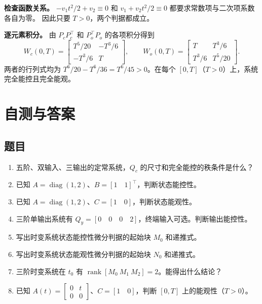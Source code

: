 \documentclass[UTF8,a4paper,12pt,fontset=fandol]{ctexart}
\DeclareMathOperator{\rank}{rank}
\begin{document}
\textbf{检查函数关系。}
$-v_1t^2/2+v_2\equiv0$ 和 $v_1+v_2t^2/2\equiv0$ 都要求常数项与二次项系数各自为零。
因此只要 $T>0$，两个判据都成立。

\textbf{逐元素积分。}
由 $P_cP_c^\top$ 和 $P_o^\top P_o$ 的各项积分得到
\[
  W_c(0,T)=\begin{bmatrix}T^5/20&-T^3/6\\-T^3/6&T\end{bmatrix},
  \qquad
  W_o(0,T)=\begin{bmatrix}T&T^3/6\\T^3/6&T^5/20\end{bmatrix}.
\]
两者的行列式均为 $T^6/20-T^6/36=T^6/45>0$。在每个 $[0,T]$（$T>0$）上，系统完全能控且完全能观。

\newpage
\section{自测与答案}\label{sec:practice}

\subsection*{题目}
\begin{enumerate}
  \item 五阶、双输入、三输出的定常系统，$Q_c$ 的尺寸和完全能控的秩条件是什么？
  \item 已知 $A=\operatorname{diag}(1,2)$、$B=[1\quad 1]^\top$，判断状态能控性。
  \item 已知 $A=\operatorname{diag}(1,2)$、$C=[1\quad 0]$，判断状态能观性。
  \item 三阶单输出系统有 $Q_y=[0\quad 0\quad 0\quad 2]$，终端输入可选。判断输出能控性。
  \item 写出时变系统状态能控性微分判据的起始块 $M_0$ 和递推式。
  \item 写出时变系统状态能观性微分判据的起始块 $N_0$ 和递推式。
  \item 三阶时变系统在 $t_0$ 有 $\rank[M_0\ M_1\ M_2]=2$。能得出什么结论？
  \item 已知 $A(t)=\left[\begin{smallmatrix}0&t\\0&0\end{smallmatrix}\right]$、$C=[1\quad 0]$，判断 $[0,T]$ 上的能观性（$T>0$）。
\end{enumerate}
\end{document}
